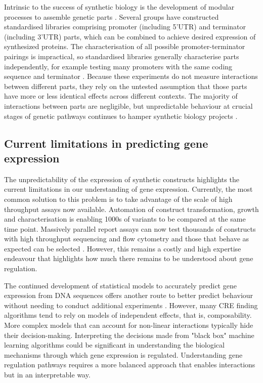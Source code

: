 \documentclass[../main.tex]{subfiles}
\begin{document}
Intrinsic to the success of synthetic biology is the development of modular processes to assemble genetic parts \parencite{Curran2013,Lee2015,Garcia2018,Andreou2018}.
Several groups have constructed standardised libraries comprising promoter (including 5’UTR) and terminator (including 3’UTR) parts, which can be combined to achieve desired expression of synthesized proteins.
The characterisation of all possible promoter-terminator pairings is impractical, so standardised libraries generally characterise parts independently, for example testing many promoters with the same coding sequence and terminator \parencite{Lee2015}.
Because these experiments do not measure interactions between different parts, they rely on the untested assumption that those parts have more or less identical effects across different contexts.
The majority of interactions between parts are negligible, but unpredictable behaviour at crucial stages of genetic pathways continues to hamper synthetic biology projects \parencite{Kittleson2012}.

\subsection{Current limitations in predicting gene expression}

The unpredictability of the expression of synthetic constructs highlights the current limitations in our understanding of gene expression.
Currently, the most common solution to this problem is to take advantage of the scale of high throughput assays now available. 
Automation of construct transformation, growth and characterisation is enabling 1000s of variants to be compared at the same time point. 
Massively parallel report assays can now test thousands of constructs with high throughput sequencing and flow cytometry and those that behave as expected can be selected \parencite{Kosuri2013, Inoue2015}. 
However, this remains a costly and high expertise endeavour that highlights how much there remains to be understood about gene regulation. 

The continued development of statistical models to accurately predict gene expression from DNA sequences offers another route to better predict behaviour without needing to conduct additional experiments \parencite{Li2015}. 
However, many CRE finding algorithms tend to rely on models of independent effects, that is, composability.
More complex models that can account for non-linear interactions typically hide their decision-making. 
Interpreting the decisions made from "black box" machine learning algorithms \parencite{Guidotti2018} could be significant in understanding the biological mechanisms through which gene expression is regulated. 
Understanding gene regulation pathways requires a more balanced approach that enables interactions but in an interpretable way. 
\end{document}
